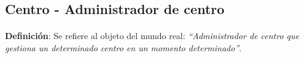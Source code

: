 \subsection{Centro - Administrador de centro}

  \paragraph{}\textbf{Definición}: Se refiere al objeto del mundo real:
  \emph{``Administrador de centro que gestiona un determinado centro en un
  momento determinado''}.



